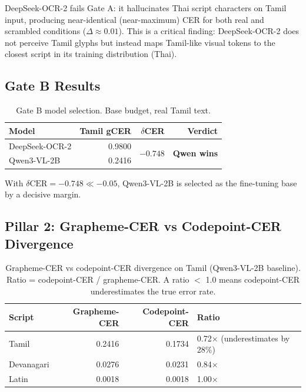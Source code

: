 \documentclass[11pt,a4paper]{article}
\begin{document}
DeepSeek-OCR-2 fails Gate A: it hallucinates Thai script characters on Tamil
input, producing near-identical (near-maximum) CER for both real and scrambled
conditions ($\Delta \approx 0.01$).
This is a critical finding: DeepSeek-OCR-2 does not perceive Tamil glyphs but
instead maps Tamil-like visual tokens to the closest script in its training
distribution (Thai).

\subsection{Gate B Results}

\begin{table}[h]
\centering
\caption{Gate B model selection. Base budget, real Tamil text.}
\label{tab:gate_b}
\begin{tabular}{lrrr}
\toprule
Model & Tamil gCER & $\delta$CER & Verdict \\
\midrule
DeepSeek-OCR-2    & 0.9800 & \multirow{2}{*}{$-0.748$} & \multirow{2}{*}{\textbf{Qwen wins}} \\
Qwen3-VL-2B       & 0.2416 & & \\
\bottomrule
\end{tabular}
\end{table}

With $\delta\text{CER} = -0.748 \ll -0.05$, Qwen3-VL-2B is selected as the
fine-tuning base by a decisive margin.

\subsection{Pillar 2: Grapheme-CER vs Codepoint-CER Divergence}

\begin{table}[h]
\centering
\caption{Grapheme-CER vs codepoint-CER divergence on Tamil (Qwen3-VL-2B baseline).
Ratio = codepoint-CER / grapheme-CER. A ratio $<$ 1.0 means codepoint-CER
underestimates the true error rate.}
\label{tab:pillar2}
\begin{tabular}{lrrl}
\toprule
Script & Grapheme-CER & Codepoint-CER & Ratio \\
\midrule
Tamil       & 0.2416 & 0.1734 & 0.72$\times$ (\textcolor{tamilred}{underestimates by 28\%}) \\
Devanagari  & 0.0276 & 0.0231 & 0.84$\times$ \\
Latin       & 0.0018 & 0.0018 & 1.00$\times$ \\
\bottomrule
\end{tabular}
\end{table}
\end{document}
